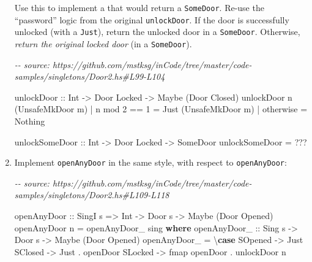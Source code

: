 \documentclass[]{article}
\newenvironment{Shaded}{}{}
\newcommand{\CommentTok}[1]{\textcolor[rgb]{0.38,0.63,0.69}{\textit{#1}}}
\newcommand{\DataTypeTok}[1]{\textcolor[rgb]{0.56,0.13,0.00}{#1}}
\newcommand{\DecValTok}[1]{\textcolor[rgb]{0.25,0.63,0.44}{#1}}
\newcommand{\FunctionTok}[1]{\textcolor[rgb]{0.02,0.16,0.49}{#1}}
\newcommand{\KeywordTok}[1]{\textcolor[rgb]{0.00,0.44,0.13}{\textbf{#1}}}
\newcommand{\NormalTok}[1]{#1}
\newcommand{\OperatorTok}[1]{\textcolor[rgb]{0.40,0.40,0.40}{#1}}
\newcommand{\OtherTok}[1]{\textcolor[rgb]{0.00,0.44,0.13}{#1}}
\begin{document}
\begin{enumerate}
  Use this to implement a that would return a \texttt{SomeDoor}. Re-use the
  ``password'' logic from the original \texttt{unlockDoor}. If the door is
  successfully unlocked (with a \texttt{Just}), return the unlocked door in a
  \texttt{SomeDoor}. Otherwise, \emph{return the original locked door} (in a
  \texttt{SomeDoor}).

\begin{Shaded}
\begin{Highlighting}[]
\CommentTok{{-}{-} source: https://github.com/mstksg/inCode/tree/master/code{-}samples/singletons/Door2.hs\#L99{-}L104}

\OtherTok{unlockDoor ::} \DataTypeTok{Int} \OtherTok{{-}>} \DataTypeTok{Door} \DataTypeTok{\textquotesingle{}Locked} \OtherTok{{-}>} \DataTypeTok{Maybe}\NormalTok{ (}\DataTypeTok{Door} \DataTypeTok{\textquotesingle{}Closed}\NormalTok{)}
\NormalTok{unlockDoor n (}\DataTypeTok{UnsafeMkDoor}\NormalTok{ m)}
    \OperatorTok{|}\NormalTok{ n }\OtherTok{\textasciigrave{}mod\textasciigrave{}} \DecValTok{2} \OperatorTok{==} \DecValTok{1} \OtherTok{=} \DataTypeTok{Just}\NormalTok{ (}\DataTypeTok{UnsafeMkDoor}\NormalTok{ m)}
    \OperatorTok{|} \FunctionTok{otherwise}      \OtherTok{=} \DataTypeTok{Nothing}

\OtherTok{unlockSomeDoor ::} \DataTypeTok{Int} \OtherTok{{-}>} \DataTypeTok{Door} \DataTypeTok{\textquotesingle{}Locked} \OtherTok{{-}>} \DataTypeTok{SomeDoor}
\NormalTok{unlockSomeDoor }\OtherTok{=} \OperatorTok{???}
\end{Highlighting}
\end{Shaded}
\item
  Implement \texttt{openAnyDoor\textquotesingle{}} in the same style, with
  respect to \texttt{openAnyDoor}:

\begin{Shaded}
\begin{Highlighting}[]
\CommentTok{{-}{-} source: https://github.com/mstksg/inCode/tree/master/code{-}samples/singletons/Door2.hs\#L109{-}L118}

\OtherTok{openAnyDoor ::} \DataTypeTok{SingI}\NormalTok{ s }\OtherTok{=>} \DataTypeTok{Int} \OtherTok{{-}>} \DataTypeTok{Door}\NormalTok{ s }\OtherTok{{-}>} \DataTypeTok{Maybe}\NormalTok{ (}\DataTypeTok{Door} \DataTypeTok{\textquotesingle{}Opened}\NormalTok{)}
\NormalTok{openAnyDoor n }\OtherTok{=}\NormalTok{ openAnyDoor\_ sing}
  \KeywordTok{where}
\OtherTok{    openAnyDoor\_ ::} \DataTypeTok{Sing}\NormalTok{ s }\OtherTok{{-}>} \DataTypeTok{Door}\NormalTok{ s }\OtherTok{{-}>} \DataTypeTok{Maybe}\NormalTok{ (}\DataTypeTok{Door} \DataTypeTok{\textquotesingle{}Opened}\NormalTok{)}
\NormalTok{    openAnyDoor\_ }\OtherTok{=}\NormalTok{ \textbackslash{}}\KeywordTok{case}
      \DataTypeTok{SOpened} \OtherTok{{-}>} \DataTypeTok{Just}
      \DataTypeTok{SClosed} \OtherTok{{-}>} \DataTypeTok{Just} \OperatorTok{.}\NormalTok{ openDoor}
      \DataTypeTok{SLocked} \OtherTok{{-}>} \FunctionTok{fmap}\NormalTok{ openDoor }\OperatorTok{.}\NormalTok{ unlockDoor n}


\end{Highlighting}
\end{Shaded}
\end{enumerate}
\end{document}
